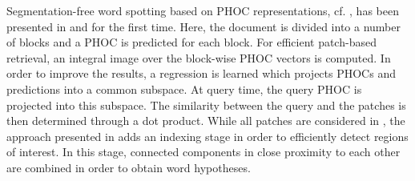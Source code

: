 Segmentation-free word spotting based on PHOC representations, cf. \cite{Almazan14}, has been presented in
\cite{Ghosh15} and \cite{Ghosh15a} for the first time.
%
Here, the document is divided into a number of blocks and a PHOC is predicted for each block.
For efficient patch-based retrieval, an integral image over the block-wise PHOC vectors is computed.
In order to improve the results, a regression is learned which projects PHOCs and predictions into a common subspace. At query time, the query PHOC is projected into this subspace.
The similarity between the query and the patches is then determined through a dot product.
While all patches are considered in \cite{Ghosh15}, the approach presented in \cite{Ghosh15a} adds an indexing stage in order to efficiently detect regions of interest. In this
stage, connected components in close proximity to each other are combined in order to obtain
word hypotheses.
